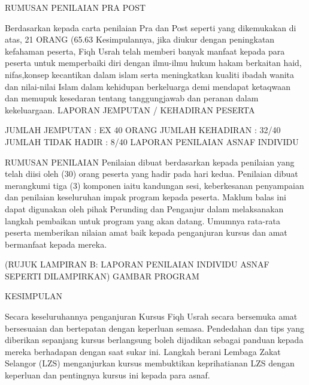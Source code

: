 RUMUSAN PENILAIAN PRA POST



Berdasarkan kepada carta penilaian Pra dan Post seperti yang dikemukakan di atas, 21 ORANG (65.63%
Kesimpulannya, jika diukur dengan peningkatan kefahaman peserta, Fiqh Usrah telah memberi banyak manfaat kepada para peserta untuk memperbaiki diri dengan ilmu-ilmu hukum hakam berkaitan haid, nifas,konsep kecantikan dalam islam serta meningkatkan kualiti ibadah wanita dan nilai-nilai Islam dalam kehidupan berkeluarga demi mendapat ketaqwaan dan memupuk kesedaran tentang tanggungjawab dan peranan dalam kekeluargaan.
LAPORAN JEMPUTAN / KEHADIRAN PESERTA


JUMLAH JEMPUTAN	: EX 40 ORANG JUMLAH KEHADIRAN	: 32/40 JUMLAH TIDAK HADIR	: 8/40
LAPORAN PENILAIAN ASNAF INDIVIDU

RUMUSAN PENILAIAN
Penilaian dibuat berdasarkan kepada penilaian yang telah diisi oleh (30) orang peserta yang hadir pada hari kedua. Penilaian dibuat merangkumi tiga (3) komponen iaitu kandungan sesi, keberkesanan penyampaian dan penilaian keseluruhan impak program kepada peserta. Maklum balas ini dapat digunakan oleh pihak Perunding dan Penganjur dalam melaksanakan langkah pembaikan untuk program yang akan datang. Umumnya rata-rata peserta memberikan nilaian amat baik kepada penganjuran kursus dan amat bermanfaat kepada mereka.

(RUJUK LAMPIRAN B: LAPORAN PENILAIAN INDIVIDU ASNAF SEPERTI DILAMPIRKAN)
GAMBAR PROGRAM







KESIMPULAN

Secara keseluruhannya penganjuran Kursus Fiqh Usrah secara bersemuka amat bersesuaian dan bertepatan dengan keperluan semasa. Pendedahan dan tips yang diberikan sepanjang kursus berlangsung boleh dijadikan sebagai panduan kepada mereka berhadapan dengan saat sukar ini. Langkah berani Lembaga Zakat Selangor (LZS) menganjurkan kursus membuktikan keprihatianan LZS dengan keperluan dan pentingnya kursus ini kepada para asnaf.



